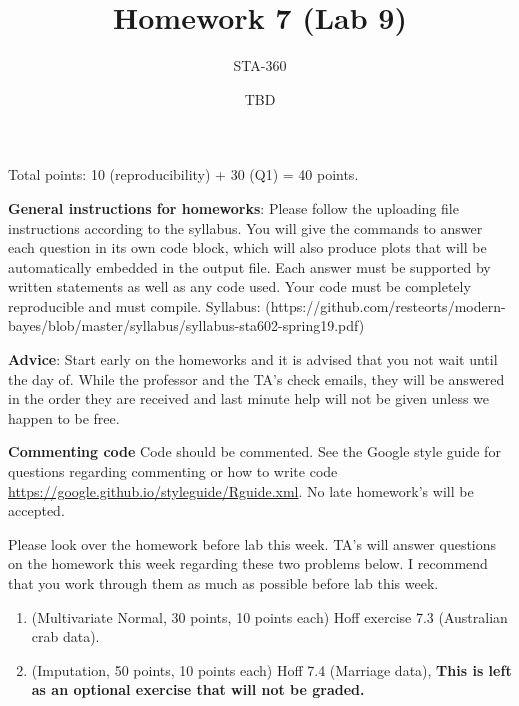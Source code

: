 \documentclass{article}
\begin{document}
\title{Homework 7 (Lab 9)}
\author{STA-360}
\date{TBD}
\maketitle

Total points: 10 (reproducibility) + 30 (Q1) = 40 points. 

\textbf{General instructions for homeworks}: Please follow the uploading file instructions according to the syllabus. You will give the commands to answer each question in its own code block, which will also produce plots that will be automatically embedded in the output file. Each answer must be supported by written statements as well as any code used. Your code must be completely reproducible and must compile. Syllabus: (https://github.com/resteorts/modern-bayes/blob/master/syllabus/syllabus-sta602-spring19.pdf)

\textbf{Advice}: Start early on the homeworks and it is advised that you not wait until the day of. While the professor and the TA's check emails, they will be answered in the order they are received and last minute help will not be given unless we happen to be free.  

\textbf{Commenting code}
Code should be commented. See the Google style guide for questions regarding commenting or how to write 
code \url{https://google.github.io/styleguide/Rguide.xml}. No late homework's will be accepted.

Please look over the homework before lab this week. TA's will answer questions on the homework this week regarding these two 
problems below. I recommend that you work through them as much as possible before lab this week. 

\begin{enumerate}
\item (Multivariate Normal, 30 points, 10 points each) Hoff exercise 7.3 (Australian crab data).
\item (Imputation, 50 points, 10 points each) Hoff 7.4 (Marriage data), \textbf{This is left as an optional exercise that will not be graded.}
\end{enumerate}
\end{document}

